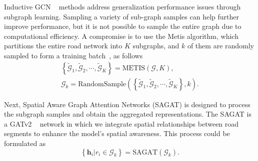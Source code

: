 Inductive GCN ~\cite{inductive_gcn} methods address generalization performance issues through subgraph learning. Sampling a variety of sub-graph samples can help further improve performance, but it is not possible to sample the entire graph due to computational efficiency. A compromise is to use the Metis algorithm, which partitions the entire road network into $K$ subgraphs, and $k$ of them are randomly sampled to form a training batch~\cite{ClusterGCN}, as follows
\begin{equation}
\begin{gathered}
    \left\{ \mathcal{\widetilde{G}}_1,  \mathcal{\widetilde{G}}_2, \cdots, \mathcal{\widetilde{G}}_K \right\} = \text{METIS} \left( \mathcal{G}, K \right), \\
    \mathcal{G}_k = \text{RandomSample} \left( \left\{ \mathcal{\widetilde{G}}_1,  \mathcal{\widetilde{G}}_2, \cdots, \mathcal{\widetilde{G}}_K \right\}, k \right).
\end{gathered}
\end{equation}

Next, Spatial Aware Graph Attention Networks (SAGAT) is designed to process the subgraph samples and obtain the aggregated representations. 
The SAGAT is a GATv2 ~\cite{GATv2} network in which we integrate spatial relationships between road segments to enhance the model's spatial awareness. This process could be formulated as 
\begin{equation}
    \left\{ \bm{h}_i \Big| r_i \in \mathcal{G}_k \right\} = \text{SAGAT} \left( \mathcal{G}_k \right).
\end{equation}

